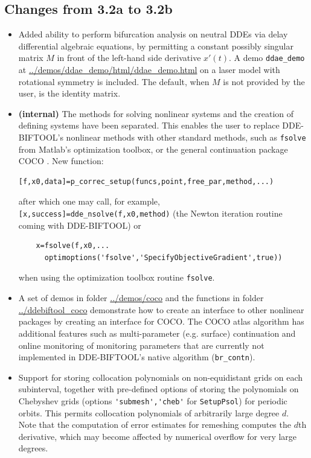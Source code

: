 \documentclass[10pt]{scrartcl}
\newcommand{\DDEBIFCODE}{\textsc{DDE-BIFTOOL}}
\newcommand{\blist}[1]{\mbox{\lstinline!#1!}}
\begin{document}
\subsection{Changes from 3.2a to 3.2b}
\label{sec:v32ato32b}
\begin{itemize}
\item Added ability to perform bifurcation analysis on neutral DDEs
  via delay differential algebraic equations, by permitting a constant
  possibly singular matrix $M$ in front of the left-hand side
  derivative $x'(t)$. A demo \blist{ddae_demo} at
  \url{../demos/ddae_demo/html/ddae_demo.html} on a laser model with
  rotational symmetry is included. The default, when $M$ is not
  provided by the user, is the identity matrix.
\item \textbf{(internal)} The methods for solving nonlinear systems
  and the creation of defining systems have been separated. This
  enables the user to replace \DDEBIFCODE{}'s nonlinear methods with
  other standard methods, such as \blist{fsolve} from Matlab's
  optimization toolbox, or the general continuation package
  \textsc{COCO} \cite{DS13}.  New function:
  \begin{lstlisting}
[f,x0,data]=p_correc_setup(funcs,point,free_par,method,...)
  \end{lstlisting}
  after which one may call, for example, \blist{[x,success]=dde_nsolve(f,x0,method)}
  (the Newton iteration routine coming with \DDEBIFCODE{}) or
  \begin{lstlisting}
    x=fsolve(f,x0,...
      optimoptions('fsolve','SpecifyObjectiveGradient',true))
  \end{lstlisting}
  when using the optimization toolbox routine \blist{fsolve}.
\item A set of demos in folder \url{../demos/coco} and the functions
  in folder \url{../ddebiftool_coco} demonstrate how to create an
  interface to other nonlinear packages by creating an interface for
  \textsc{COCO}. The \textsc{COCO} atlas algorithm has additional
  features such as multi-parameter (e.g. surface) continuation and
  online monitoring of monitoring parameters that are currently not
  implemented in \DDEBIFCODE{}'s native algorithm (\blist{br_contn}).
\item Support for storing collocation polynomials on non-equidistant
  grids on each subinterval, together with pre-defined options of
  storing the polynomials on Chebyshev grids (options
  \blist{'submesh','cheb'} for \blist{SetupPsol}) for periodic
  orbits. This permits collocation polynomials of arbitrarily large
  degree $d$. Note that the computation of error estimates for
  remeshing computes the $d$th derivative, which may become affected
  by numerical overflow for very large degrees.


\end{itemize}
\end{document}
